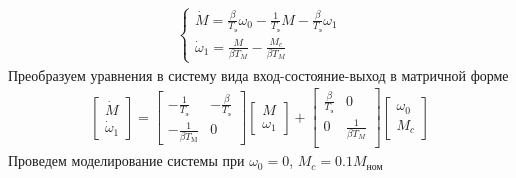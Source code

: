 \begin{gather*}
    \begin{cases}
        \dot{M} = \frac{\beta}{T_\text{э}}\omega_0-\frac{1}{T_\text{э}}M-\frac{\beta}{T_\text{э}}\omega_1\\
        \dot{\omega}_1 = \frac{M}{\beta T_M}-\frac{M_c}{\beta T_M}
    \end{cases}
\end{gather*}
Преобразуем уравнения в систему вида вход-состояние-выход в матричной форме
\begin{gather*}
    \begin{bmatrix}
        \dot{M} \\
        \dot{\omega}_1
    \end{bmatrix}
    =
    \begin{bmatrix}
        -\frac{1}{T_\text{э}} & -\frac{\beta}{T_\text{э}}\\
        -\frac{1}{\beta T_\text{M}} & 0
    \end{bmatrix}
    \begin{bmatrix}
        M \\
        \omega_1
    \end{bmatrix}+
    \begin{bmatrix}
        \frac{\beta}{T_\text{э}}&0\\
        0&\frac{1}{\beta T_M}\\
    \end{bmatrix}
    \begin{bmatrix}
        \omega_0\\
        M_c
    \end{bmatrix}
\end{gather*}
Проведем моделирование системы при $\omega_0 = 0$, $M_c = 0.1M_\text{ном}$
